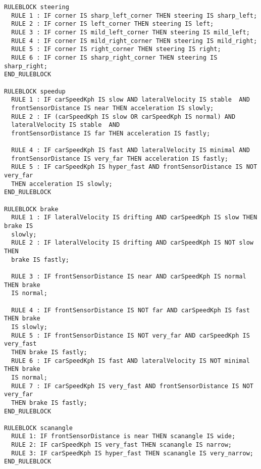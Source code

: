 \begin{lstlisting}
RULEBLOCK steering
  RULE 1 : IF corner IS sharp_left_corner THEN steering IS sharp_left;
  RULE 2 : IF corner IS left_corner THEN steering IS left;
  RULE 3 : IF corner IS mild_left_corner THEN steering IS mild_left;
  RULE 4 : IF corner IS mild_right_corner THEN steering IS mild_right;
  RULE 5 : IF corner IS right_corner THEN steering IS right;
  RULE 6 : IF corner IS sharp_right_corner THEN steering IS sharp_right;
END_RULEBLOCK

RULEBLOCK speedup
  RULE 1 : IF carSpeedKph IS slow AND lateralVelocity IS stable  AND 
  frontSensorDistance IS near THEN acceleration IS slowly;
  RULE 2 : IF (carSpeedKph IS slow OR carSpeedKph IS normal) AND 
  lateralVelocity IS stable  AND 
  frontSensorDistance IS far THEN acceleration IS fastly;

  RULE 4 : IF carSpeedKph IS fast AND lateralVelocity IS minimal AND 
  frontSensorDistance IS very_far THEN acceleration IS fastly;
  RULE 5 : IF carSpeedKph IS hyper_fast AND frontSensorDistance IS NOT very_far 
  THEN acceleration IS slowly;
END_RULEBLOCK

RULEBLOCK brake
  RULE 1 : IF lateralVelocity IS drifting AND carSpeedKph IS slow THEN brake IS 
  slowly;
  RULE 2 : IF lateralVelocity IS drifting AND carSpeedKph IS NOT slow THEN 
  brake IS fastly;

  RULE 3 : IF frontSensorDistance IS near AND carSpeedKph IS normal THEN brake 
  IS normal;

  RULE 4 : IF frontSensorDistance IS NOT far AND carSpeedKph IS fast THEN brake 
  IS slowly;
  RULE 5 : IF frontSensorDistance IS NOT very_far AND carSpeedKph IS very_fast 
  THEN brake IS fastly;
  RULE 6 : IF carSpeedKph IS fast AND lateralVelocity IS NOT minimal THEN brake 
  IS normal;
  RULE 7 : IF carSpeedKph IS very_fast AND frontSensorDistance IS NOT very_far 
  THEN brake IS fastly;
END_RULEBLOCK

RULEBLOCK scanangle
  RULE 1: IF frontSensorDistance is near THEN scanangle IS wide;
  RULE 2: IF carSpeedKph IS very_fast THEN scanangle IS narrow;
  RULE 3: IF carSpeedKph IS hyper_fast THEN scanangle IS very_narrow;
END_RULEBLOCK

\end{lstlisting}